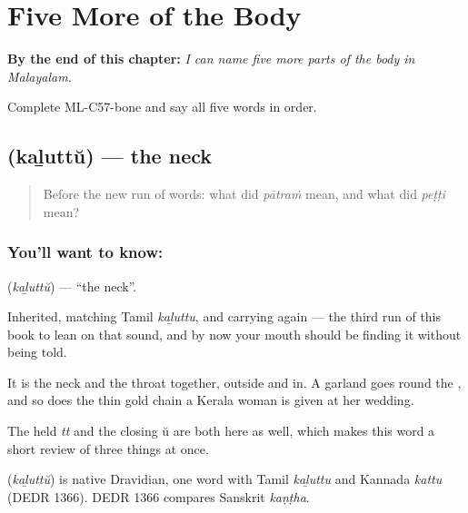 
\chapter{Five More of the Body}
\label{ch:ml-five-more-of-the-body}

\begin{chapteropening}
\textbf{By the end of this chapter:} \emph{I can name five more parts of the body in Malayalam.}

Complete ML-C57-bone and say all five words in order.
\end{chapteropening}

\section[\texorpdfstring{\ml{കഴുത്ത്} (kaḻuttŭ)}{കഴുത്ത് (kaḻuttŭ)}]{ (kaḻuttŭ) — the neck}

\label{lesson:ML-C57-neck}



\begin{quote}
Before the new run of words: what did \emph{pātraṁ} mean, and what did \emph{peṭṭi} mean?
\end{quote}

\subsection*{You'll want to know: }
\textbf{} (\emph{kaḻuttŭ}) — \textquotedblleft{}the neck\textquotedblright{}.

Inherited, matching Tamil \emph{kaḻuttu}, and carrying  again — the third run of this book to lean on that sound, and by now your mouth should be finding it without being told.

It is the neck and the throat together, outside and in. A garland goes round the , and so does the thin gold chain a Kerala woman is given at her wedding.

The held \emph{tt} and the closing ŭ are both here as well, which makes this word a short review of three things at once.

\begin{cousinweb}
\textbf{} (\emph{kaḻuttŭ}) is native Dravidian, one word with Tamil \emph{kaḻuttu} and Kannada \emph{kattu} (DEDR 1366). DEDR 1366 compares Sanskrit \emph{kaṇṭha}.
\end{cousinweb}

